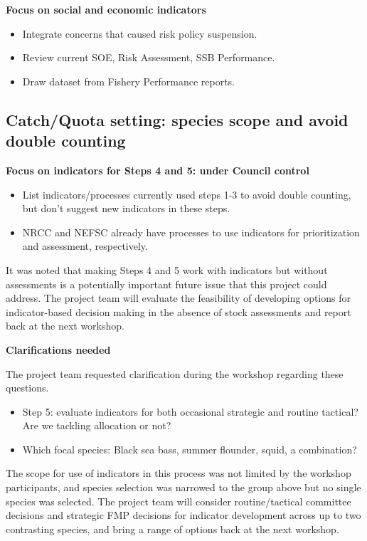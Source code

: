 \documentclass[
]{article}
\providecommand{\tightlist}{%
  \setlength{\itemsep}{0pt}\setlength{\parskip}{0pt}}
\begin{document}
\textbf{Focus on social and economic indicators}

\begin{itemize}
\tightlist
\item
  Integrate concerns that caused risk policy suspension.
\item
  Review current SOE, Risk Assessment, SSB Performance.
\item
  Draw dataset from Fishery Performance reports.
\end{itemize}

\subsection{Catch/Quota setting: species scope and avoid double counting}\label{catchquota-setting-species-scope-and-avoid-double-counting}

\textbf{Focus on indicators for Steps 4 and 5: under Council control}

\begin{itemize}
\tightlist
\item
  List indicators/processes currently used steps 1-3 to avoid double counting, but don't suggest new indicators in these steps.
\item
  NRCC and NEFSC already have processes to use indicators for prioritization and assessment, respectively.
\end{itemize}

It was noted that making Steps 4 and 5 work with indicators but without assessments is a potentially important future issue that this project could address. The project team will evaluate the feasibility of developing options for indicator-based decision making in the absence of stock assessments and report back at the next workshop.

\textbf{Clarifications needed}

The project team requested clarification during the workshop regarding these questions.

\begin{itemize}
\tightlist
\item
  Step 5: evaluate indicators for both occasional strategic and routine tactical? Are we tackling allocation or not?
\item
  Which focal species: Black sea bass, summer flounder, squid, a combination?
\end{itemize}

The scope for use of indicators in this process was not limited by the workshop participants, and species selection was narrowed to the group above but no single species was selected. The project team will consider routine/tactical committee decisions and strategic FMP decisions for indicator development across up to two contrasting species, and bring a range of options back at the next workshop.
\end{document}

